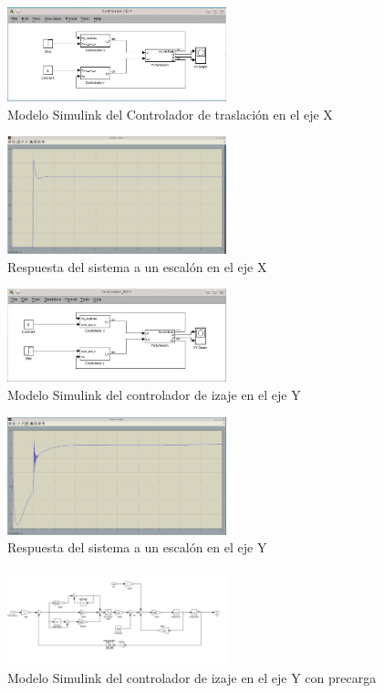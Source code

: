 \documentclass[journal]{IEEEtran}
\begin{document}
\begin{figure}[!t]
 \centering
  \includegraphics[width=2.5in]{Test_x.jpeg}
  \caption{Modelo Simulink del Controlador de traslación en el eje X}
  \label{fig:testx}
\end{figure}

\begin{figure}[!t]
 \centering
  \includegraphics[width=2.5in]{Test_x_posicion.jpeg}
  \caption{Respuesta del sistema a un escalón en el eje X}
  \label{fig:resx}
\end{figure}


\begin{figure}[!t]
 \centering
  \includegraphics[width=2.5in]{Test_y.jpeg}
  \caption{Modelo Simulink del controlador de izaje en el eje Y}
  \label{fig:testy}
\end{figure}

\begin{figure}[!t]
 \centering
  \includegraphics[width=2.5in]{Test_y_posicion.jpeg}
  \caption{Respuesta del sistema a un escalón en el eje Y}
  \label{fig:resy}
\end{figure}

\begin{figure}[!t]
 \centering
  \includegraphics[width=2.5in]{Controlador_precarga.jpeg}
  \caption{Modelo Simulink del controlador de izaje en el eje Y con precarga}
  \label{fig:testyComp}
\end{figure}
\end{document}
